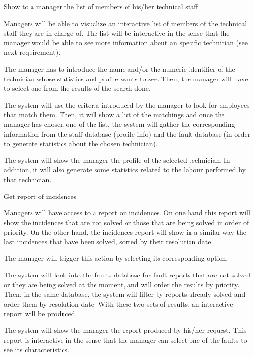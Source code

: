 \begin{requirement}{Show to a manager the list of members of his/her technical staff}

\reqdesc Managers will be able to visualize an interactive list of members of the technical staff they are in charge of. The list will be interactive in the sense that the manager would be able to see more information about an specific technician (see next requirement).

\reqin The manager has to introduce the name and/or the numeric identifier of the technician whose statistics and profile wants to see. Then, the manager will have to select one from the results of the search done.

\reqsteps The system will use the criteria introduced by the manager to look for employees that match them. Then, it will show a list of the matchings and once the manager has chosen one of the list, the system will gather the corresponding information from the staff database (profile info) and the fault database (in order to generate statistics about the chosen technician).

\reqout The system will show the manager the profile of the selected technician. In addition, it will also generate some statistics related to the labour performed by that technician.

\end{requirement}


\begin{requirement}{Get report of incidences}

\reqdesc Managers will have access to a report on incidences. On one hand this report will show the incidences that are not solved or those that are being solved in order of priority. On the other hand, the incidences report will show in a similar way the last incidences that have been solved, sorted by
their resolution date.

\reqin The manager will trigger this action by selecting its corresponding option.

\reqsteps The system will look into the faults database for fault reports that are not solved or they are being solved at the moment, and will order the results by priority. Then, in the same database, the system will filter by reports already solved and order them by resolution date. With these two sets of results, an interactive report will be produced.

\reqout The system will show the manager the report produced by his/her request. This report is interactive in the sense that the manager can select one of the faults to see its characteristics.

\end{requirement}



